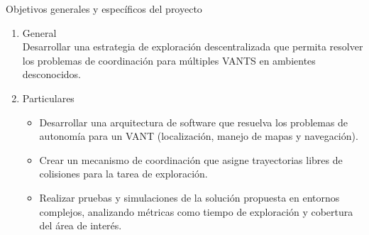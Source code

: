 \documentclass[
  24pt, %
  aspectratio=169, %
]{beamer}
\begin{document}
\begin{frame}{Objetivos generales y específicos del proyecto}
  \begin{enumerate}
    \item General \\
    \bigskip
    Desarrollar una estrategia de exploración descentralizada que permita resolver los problemas de coordinación para múltiples VANTS en ambientes desconocidos.
    \pause
    \bigskip
    \item Particulares\\
    
    \begin{itemize}
    \item Desarrollar una arquitectura de software que resuelva los problemas de autonomía para un VANT (localización, manejo de mapas y navegación).
    \item Crear un mecanismo de coordinación que asigne trayectorias libres de colisiones para la tarea de exploración.
    \item Realizar pruebas y simulaciones de la solución propuesta en entornos complejos, analizando métricas como tiempo de exploración y cobertura del área de interés.
    \end{itemize}
  \end{enumerate}
\end{frame}

\end{document}
